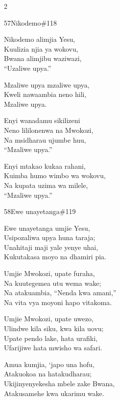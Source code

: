 \documentclass{article}
\begin{document}
\begin{multicols}{2}
\begin{hymn}{57}{Nikodemo}{\#118}
\begin{stanza}
Nikodemo alimjia Yesu,\\
Kuulizia njia ya wokovu,\\
Bwana alimjibu waziwazi,\\
``Uzaliwe upya.''
\end{stanza}
\begin{chorus}
Mzaliwe upya mzaliwe upya,\\
Kweli nawaambia neno hili,\\
Mzaliwe upya.
\end{chorus}
\begin{stanza}
Enyi wanadamu sikilizeni\\
Neno lililonenwa na Mwokozi,\\
Na msidharau ujumbe huu,\\
``Mzaliwe upya.''
\end{stanza}
\begin{stanza}
Enyi mtakao kukaa rahani,\\
Kuimba humo wimbo wa wokovu,\\
Na kupata uzima wa milele,\\
``Mzaliwe upya.''
\end{stanza}
\end{hymn}

\begin{hymn}{58}{Ewe unayetanga}{\#119}
\begin{stanza}
Ewe unayetanga umjie Yesu,\\
Usipozaliwa upya huna taraja;\\
Unahitaji maji yale yenye uhai,\\
Kukutakasa moyo na dhamiri pia.
\end{stanza}
\begin{stanza}
Umjie Mwokozi, upate furaha,\\
Na kuutegemea utu wema wake;\\
Na atakuambia, ``Nenda kwa amani,''\\
Na vita vya moyoni hapo vitakoma.
\end{stanza}
\begin{stanza}
Umjie Mwokozi, upate uwezo,\\
Ulindwe kila siku, kwa kila uovu;\\
Upate pendo lake, hata urafiki,\\
Ufarijiwe hata mwisho wa safari.
\end{stanza}
\begin{stanza}
Amua kumjia, `japo una hofu,\\
Atakuokoa na hatakudharau;\\
Ukijinyenyekesha mbele zake Bwana,\\
Atakusamehe kwa ukarimu wake.
\end{stanza}
\end{hymn}


\end{multicols}
\end{document}
